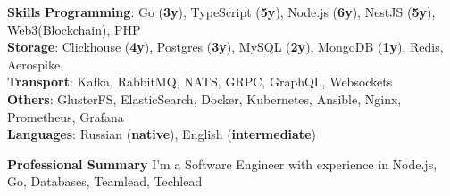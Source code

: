 \documentclass{resume}
\begin{document}
\begin{rSection}{\textbf{Skills}}
       \textbf{Programming}: Go ({\textbf{3y}}), TypeScript ({\textbf{5y}}), Node.js ({\textbf{6y}}), NestJS ({\textbf{5y}}), Web3(Blockchain), PHP
       \\ \textbf{Storage}: Clickhouse ({\textbf{4y}}), Postgres ({\textbf{3y}}), MySQL ({\textbf{2y}}), MongoDB ({\textbf{1y}}), Redis, Aerospike
       \\ \textbf{Transport}: Kafka, RabbitMQ, NATS, GRPC, GraphQL, Websockets
       \\ \textbf{Others}: GlusterFS, ElasticSearch, Docker, Kubernetes, Ansible, Nginx, Prometheus, Grafana
       \\ \textbf{Languages}: Russian ({\textbf{native}}), English ({\textbf{intermediate}})
\end{rSection}

\begin{rSection}{\textbf{Professional Summary}}
{
    I'm a Software Engineer with experience in Node.js, Go, Databases, Teamlead, Techlead
}

\end{rSection}
\end{document}
